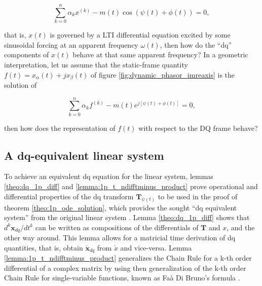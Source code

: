 \begin{equation} \sum\limits_{k=0}^{n} \alpha_k x^{\left(k\right)} - m(t)\cos\left(\psi(t) + \phi(t)\right) = 0, \label{eq:linsys_sinusoidal_forcing}\end{equation}

	\noindent that is, $x(t)$ is governed by a LTI differential equation excited by some sinusoidal forcing at an apparent frequency $\omega(t)$, then how do the ``dq'' components of $x(t)$ behave at that same apparent frequency? In a geometric interpretation, let us assume that the static-frame quantity $f(t) = x_\alpha(t) + jx_\beta(t)$ of figure \ref{fig:dynamic_phasor_imreaxis} is the solution of

\begin{equation} \sum\limits_{k=0}^{n} \alpha_k f^{\left(k\right)} -  m\left(t\right)e^{j\left[\psi(t) + \phi(t)\right]} = 0, \label{eq:linsys_sinusoidal_forcing_complex}\end{equation}

	\noindent then how does the representation of $f(t)$ with respect to the DQ frame behave?

\subsection{A dq-equivalent linear system} %

	To achieve an equivalent dq equation for the linear system, lemmas \ref{theo:dq_1p_diff} and \ref{lemma:1p_t_ndifftminus_product} prove operational and differential properties of the dq transform $\mathbf{T}_{\psi(t)}$ to be used in the proof of theorem \ref{theo:1p_ode_solution}, which provides the sought ``dq equivalent system'' from the original linear system . Lemma \ref{theo:dq_1p_diff} shows that $d^k\mathbf{x}_{dq}/dt^k$ can be written as compositions of the differentials of $\mathbf{T}$ and $x$, and the other way around.  This lemma allows for a matricial time derivation of dq quantities, that is, obtain $\dot{\mathbf{x}}_{dq}$ from $\dot{x}$ and vice-versa. Lemma \ref{lemma:1p_t_ndifftminus_product} generalizes the Chain Rule for a k-th order differential of a complex matrix by using then generalization of the k-th order Chain Rule for single-variable functions, known as Faà Di Bruno's formula .
	
